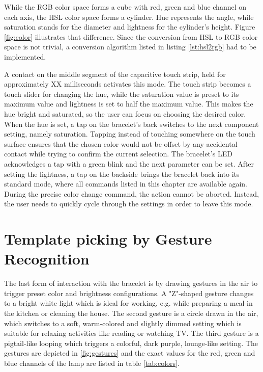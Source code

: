 
While the RGB color space forms a cube with red, green and blue channel on each axis, the \ac{HSL} color space forms a cylinder. Hue represents the angle, while saturation stands for the diameter and lightness for the cylinder's height. Figure \ref{fig:color} illustrates that difference. Since the conversion from \ac{HSL} to RGB color space is not trivial, a conversion algorithm listed in listing \ref{lst:hsl2rgb} had to be implemented.


A contact on the middle segment of the capacitive touch strip, held for approximately XX milliseconds activates this mode. The touch strip becomes a touch slider for changing the hue, while the saturation value is preset to its maximum value and lightness is set to half the maximum value. This makes the hue bright and saturated, so the user can focus on choosing the desired color. When the hue is set, a tap on the bracelet's back switches to the next component setting, namely saturation. Tapping instead of touching somewhere on the touch surface ensures that the chosen color would not be offset by any accidental contact while trying to confirm the current selection. The bracelet's \ac{LED} acknowledges a tap with a green blink and the next parameter can be set. After setting the lightness, a tap on the backside brings the bracelet back into its standard mode, where all commands listed in this chapter are available again. During the precise color change command, the action cannot be aborted. Instead, the user needs to quickly cycle through the settings in order to leave this mode.

\section{Template picking by Gesture Recognition}
The last form of interaction with the bracelet is by drawing gestures in the air to trigger preset color and brightness configurations. A "Z"-shaped gesture changes to a bright white light which is ideal for working, e.g. while preparing a meal in the kitchen or cleaning the house. The second gesture is a circle drawn in the air, which switches to a soft, warm-colored and slightly dimmed setting which is suitable for relaxing activities like reading or watching TV. The third gesture is a pigtail-like looping which triggers a colorful, dark purple, lounge-like setting. The gestures are depicted in \ref{fig:gestures} and the exact values for the red, green and blue channels of the lamp are listed in table \ref{tab:colors}.

